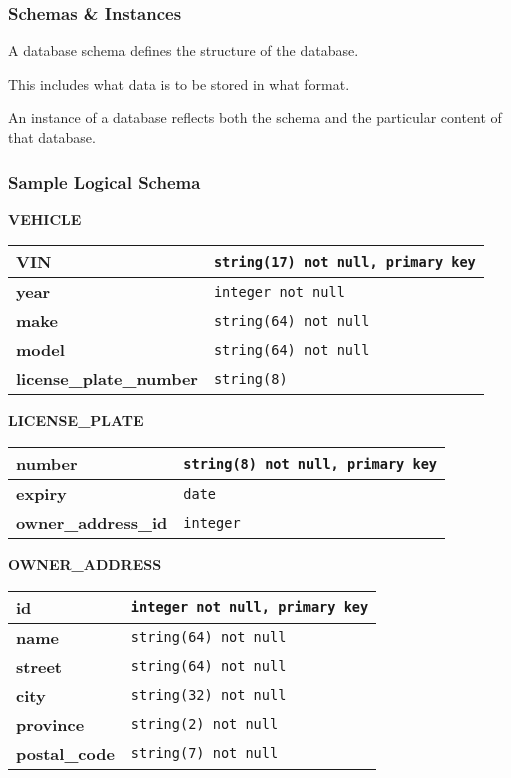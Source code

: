 \begin{frame}
\frametitle{Schemas \& Instances}

A database \alert{schema} defines the structure of the database. 

This includes what data is  to be stored in what format. 

An instance of a database reflects both the schema and the particular content of that database.

\end{frame}



\begin{frame}
\frametitle{Sample Logical Schema}


	\textbf{VEHICLE}\\
	\begin{tabular}{|l|l|}\hline
		\textbf{VIN} & \texttt{string(17) not null, primary key}\\ \hline		
		\textbf{year} & \texttt{integer not null}\\ \hline
		\textbf{make} & \texttt{string(64) not null}\\ \hline
		\textbf{model} & \texttt{string(64) not null}\\ \hline		
		\textbf{license\_plate\_number} & \texttt{string(8)}\\ \hline		
	\end{tabular}
	
	\textbf{LICENSE\_PLATE}\\
	\begin{tabular}{|l|l|}\hline
		\textbf{number} & \texttt{string(8) not null, primary key}\\ \hline
		\textbf{expiry} & \texttt{date} \\ \hline
		\textbf{owner\_address\_id} & \texttt{integer}\\ \hline		
	\end{tabular}
	
		\textbf{OWNER\_ADDRESS}\\
	\begin{tabular}{|l|l|}\hline
		\textbf{id} & \texttt{integer not null,  primary key}\\ \hline
		\textbf{name} & \texttt{string(64) not null}\\ \hline
		\textbf{street} & \texttt{string(64) not null}\\ \hline
		\textbf{city} & \texttt{string(32) not null}\\ \hline
		\textbf{province} & \texttt{string(2) not null}\\ \hline
		\textbf{postal\_code} & \texttt{string(7) not null}\\ \hline

	\end{tabular}

\end{frame}



